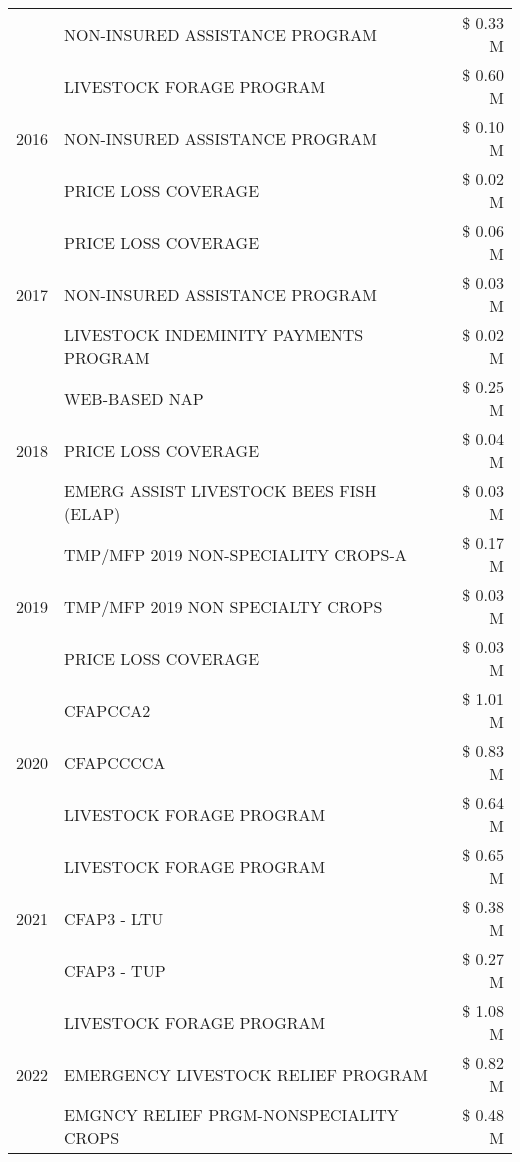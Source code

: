 \begin{tabular}{llr}
 & NON-INSURED ASSISTANCE PROGRAM & \$ 0.33 M \\
\cline{1-3}
\multirow[t]{3}{*}{2016} & LIVESTOCK FORAGE PROGRAM & \$ 0.60 M \\
 & NON-INSURED ASSISTANCE PROGRAM & \$ 0.10 M \\
 & PRICE LOSS COVERAGE & \$ 0.02 M \\
\cline{1-3}
\multirow[t]{3}{*}{2017} & PRICE LOSS COVERAGE & \$ 0.06 M \\
 & NON-INSURED ASSISTANCE PROGRAM & \$ 0.03 M \\
 & LIVESTOCK INDEMINITY PAYMENTS PROGRAM & \$ 0.02 M \\
\cline{1-3}
\multirow[t]{3}{*}{2018} & WEB-BASED NAP & \$ 0.25 M \\
 & PRICE LOSS COVERAGE & \$ 0.04 M \\
 & EMERG ASSIST LIVESTOCK BEES FISH (ELAP) & \$ 0.03 M \\
\cline{1-3}
\multirow[t]{3}{*}{2019} & TMP/MFP 2019 NON-SPECIALITY CROPS-A & \$ 0.17 M \\
 & TMP/MFP 2019 NON SPECIALTY CROPS & \$ 0.03 M \\
 & PRICE LOSS COVERAGE & \$ 0.03 M \\
\cline{1-3}
\multirow[t]{3}{*}{2020} & CFAPCCA2 & \$ 1.01 M \\
 & CFAPCCCCA & \$ 0.83 M \\
 & LIVESTOCK FORAGE PROGRAM & \$ 0.64 M \\
\cline{1-3}
\multirow[t]{3}{*}{2021} & LIVESTOCK FORAGE PROGRAM & \$ 0.65 M \\
 & CFAP3 - LTU & \$ 0.38 M \\
 & CFAP3 - TUP & \$ 0.27 M \\
\cline{1-3}
\multirow[t]{3}{*}{2022} & LIVESTOCK FORAGE PROGRAM & \$ 1.08 M \\
 & EMERGENCY LIVESTOCK RELIEF PROGRAM & \$ 0.82 M \\
 & EMGNCY RELIEF PRGM-NONSPECIALITY CROPS & \$ 0.48 M \\
\cline{1-3}
\bottomrule
\end{tabular}
